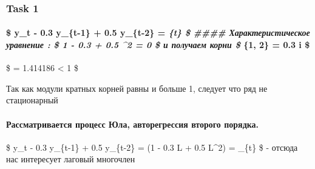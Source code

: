\documentclass[11pt]{article}
\begin{document}
    \hypertarget{task-1}{%
\subsubsection{Task 1}\label{task-1}}

    \hypertarget{y_t---0.3-y_t-1-0.5-y_t-2-t-ux445ux430ux440ux430ux43aux442ux435ux440ux438ux441ux442ux438ux447ux435ux441ux43aux43eux435-ux443ux440ux430ux432ux43dux435ux43dux438ux435-1---0.3-0.5-2-0-ux438-ux43fux43eux43bux443ux447ux430ux435ux43c-ux43aux43eux440ux43dux438-1-2-0.3-1.382-i}{%
\paragraph{\texorpdfstring{\$ y\_t - 0.3 y\_\{t-1\} + 0.5 y\_\{t-2\} =
\xi\emph{\{t\} \$ \#\#\#\# Характеристическое уравнение : \$ 1 - 0.3
\alpha + 0.5 \alpha\^{}2 = 0 \$ и получаем корни \$ \alpha}\{1, 2\} =
0.3  i
\$}{\$ y\_t - 0.3 y\_\{t-1\} + 0.5 y\_\{t-2\} = \{t\} \$ \#\#\#\# Характеристическое уравнение : \$ 1 - 0.3 + 0.5 \^{}2 = 0 \$ и получаем корни \$ \{1, 2\} = 0.3 1.382 i \$}}\label{y_t---0.3-y_t-1-0.5-y_t-2-t-ux445ux430ux440ux430ux43aux442ux435ux440ux438ux441ux442ux438ux447ux435ux441ux43aux43eux435-ux443ux440ux430ux432ux43dux435ux43dux438ux435-1---0.3-0.5-2-0-ux438-ux43fux43eux43bux443ux447ux430ux435ux43c-ux43aux43eux440ux43dux438-1-2-0.3-1.382-i}}

\$ \textbar{} \alpha \textbar{} = 1.414186 \textless{} 1 \$

Так как модули кратных корней равны и больше 1, следует что ряд не
стационарный

    \hypertarget{ux440ux430ux441ux441ux43cux430ux442ux440ux438ux432ux430ux435ux442ux441ux44f-ux43fux440ux43eux446ux435ux441ux441-ux44eux43bux430-ux430ux432ux442ux43eux440ux435ux433ux440ux435ux441ux441ux438ux44f-ux432ux442ux43eux440ux43eux433ux43e-ux43fux43eux440ux44fux434ux43aux430.}{%
\paragraph{Рассматривается процесс Юла, авторегрессия второго
порядка.}\label{ux440ux430ux441ux441ux43cux430ux442ux440ux438ux432ux430ux435ux442ux441ux44f-ux43fux440ux43eux446ux435ux441ux441-ux44eux43bux430-ux430ux432ux442ux43eux440ux435ux433ux440ux435ux441ux441ux438ux44f-ux432ux442ux43eux440ux43eux433ux43e-ux43fux43eux440ux44fux434ux43aux430.}}

    \$ y\_t - 0.3 y\_\{t-1\} + 0.5 y\_\{t-2\} = (1 - 0.3 L + 0.5 L\^{}2) =
\xi\_\{t\} \$ - отсюда нас интересует лаговый многочлен
\end{document}
